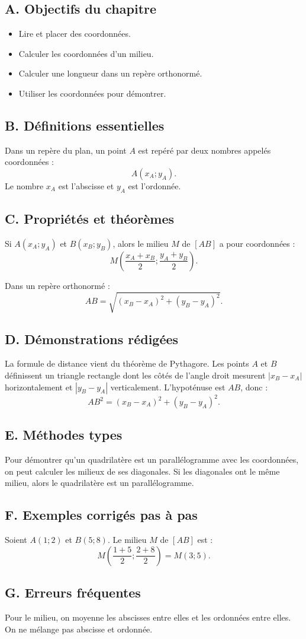 \documentclass[11pt,a4paper]{article}
\newcommand{\objectif}[1]{\subsection*{A. Objectifs du chapitre}#1}
\newcommand{\defs}{\subsection*{B. Définitions essentielles}}
\newcommand{\props}{\subsection*{C. Propriétés et théorèmes}}
\newcommand{\demos}{\subsection*{D. Démonstrations rédigées}}
\newcommand{\methodes}{\subsection*{E. Méthodes types}}
\newcommand{\exemples}{\subsection*{F. Exemples corrigés pas à pas}}
\newcommand{\erreurs}{\subsection*{G. Erreurs fréquentes}}
\begin{document}
\objectif{
\begin{itemize}
\item Lire et placer des coordonnées.
\item Calculer les coordonnées d'un milieu.
\item Calculer une longueur dans un repère orthonormé.
\item Utiliser les coordonnées pour démontrer.
\end{itemize}}

\defs
\begin{definitionbox}
Dans un repère du plan, un point $A$ est repéré par deux nombres appelés coordonnées :
\[
A(x_A;y_A).
\]
Le nombre $x_A$ est l'abscisse et $y_A$ est l'ordonnée.
\end{definitionbox}

\props
\begin{proprietebox}
Si $A(x_A;y_A)$ et $B(x_B;y_B)$, alors le milieu $M$ de $[AB]$ a pour coordonnées :
\[
M\left(\frac{x_A+x_B}{2};\frac{y_A+y_B}{2}\right).
\]
\end{proprietebox}

\begin{proprietebox}
Dans un repère orthonormé :
\[
AB=\sqrt{(x_B-x_A)^2+(y_B-y_A)^2}.
\]
\end{proprietebox}

\demos
\begin{preuvebox}
La formule de distance vient du théorème de Pythagore. Les points $A$ et $B$ définissent un triangle rectangle dont les côtés de l'angle droit mesurent $|x_B-x_A|$ horizontalement et $|y_B-y_A|$ verticalement. L'hypoténuse est $AB$, donc :
\[
AB^2=(x_B-x_A)^2+(y_B-y_A)^2.
\]
\end{preuvebox}

\methodes
\begin{methodebox}
Pour démontrer qu'un quadrilatère est un parallélogramme avec les coordonnées, on peut calculer les milieux de ses diagonales. Si les diagonales ont le même milieu, alors le quadrilatère est un parallélogramme.
\end{methodebox}

\exemples
\begin{exemplebox}
Soient $A(1;2)$ et $B(5;8)$. Le milieu $M$ de $[AB]$ est :
\[
M\left(\frac{1+5}{2};\frac{2+8}{2}\right)=M(3;5).
\]
\end{exemplebox}

\erreurs
\begin{attentionbox}
Pour le milieu, on moyenne les abscisses entre elles et les ordonnées entre elles. On ne mélange pas abscisse et ordonnée.
\end{attentionbox}
\end{document}
